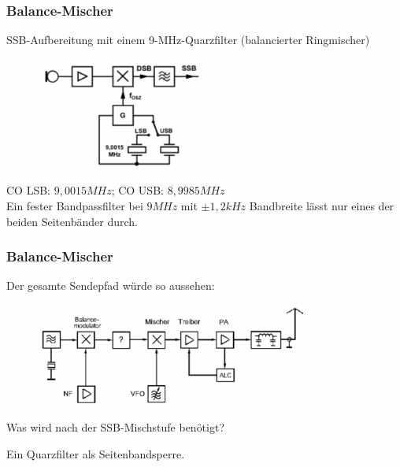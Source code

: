 \begin{frame}
  \frametitle{Balance-Mischer}

  SSB-Aufbereitung mit einem 9-MHz-Quarzfilter (balancierter Ringmischer)

  \begin{center}
    \begin{figure}
      \includegraphics[width=0.5\textwidth,height=.4\textheight,keepaspectratio]{a13/TG106.png}
    \end{figure}
  \end{center}

  {\small CO LSB: $9,0015MHz$; CO USB: $8,9985MHz$}\\[.5em]

  Ein fester Bandpassfilter bei $9MHz$ mit $\pm1,2kHz$ Bandbreite lässt nur eines der beiden Seitenbänder durch.

\end{frame}

\begin{frame}
  \frametitle{Balance-Mischer}

  Der gesamte Sendepfad würde so aussehen:

  \begin{center}
    \begin{figure}
      \includegraphics[width=0.8\textwidth,height=.5\textheight,keepaspectratio]{a13/TG101.png}
    \end{figure}
  \end{center}

  Was wird nach der SSB-Mischstufe benötigt?
  \vspace{1em}
  \pause

  Ein Quarzfilter als Seitenbandsperre.

\end{frame}

